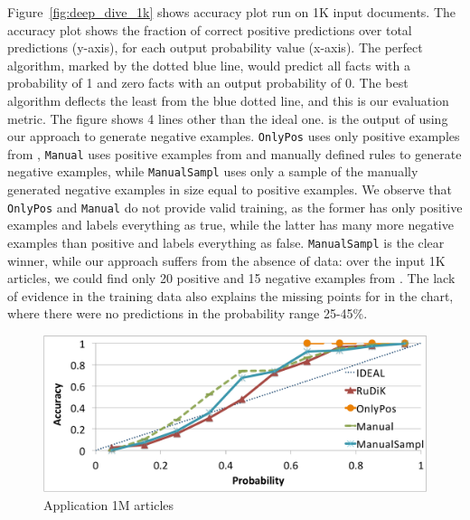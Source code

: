 Figure~\ref{fig:deep_dive_1k} shows \deepdive accuracy plot run on 1K input documents. The accuracy plot shows the fraction of correct positive predictions over total predictions (y-axis), for each output probability value (x-axis). The perfect algorithm, marked by the dotted blue line, would predict all facts with a probability of 1 and zero facts with an output probability of 0.
The best algorithm deflects the least from the blue dotted line, and this is our evaluation metric.
The figure shows 4 lines other than the ideal one. \krd is the output of \deepdive using our approach to generate negative examples. \texttt{OnlyPos} uses only positive examples from \dbpedia, \texttt{Manual} uses positive examples from \dbpedia and manually defined rules to generate negative examples, while \texttt{ManualSampl} uses only a sample of the manually generated negative examples in size equal to positive examples. We observe that \texttt{OnlyPos} and \texttt{Manual} do not provide valid training, as the former has only positive examples and labels everything as true, while the latter has many more negative examples than positive and labels everything as false. \texttt{ManualSampl} is the clear winner, while our approach suffers from the absence of data: over the input 1K articles, we could find only 20 positive and 15 negative examples from \dbpedia.
The lack of evidence in the training data also explains the missing points for \krd in the chart, where there were no predictions in the probability range 25-45\%.

\begin{figure}[t]
	\centering
	\includegraphics[width=.95\columnwidth]{include/figure/deepDive1M.pdf}
		\vspace{-1ex}
	\caption{\deepdive Application 1M articles}
	\label{fig:deep_dive_1M}
\end{figure}

